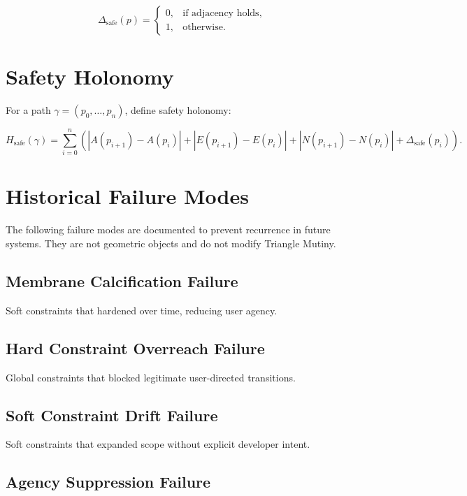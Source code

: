 \documentclass[11pt]{article}
\begin{document}
\[
\Delta_{\mathrm{safe}}(p)
  = \begin{cases}
      0, & \text{if adjacency holds}, \\
      1, & \text{otherwise}.
    \end{cases}
\]

\section{Safety Holonomy}

For a path $\gamma = (p_0, \ldots, p_n)$, define safety holonomy:

\[
H_{\mathrm{safe}}(\gamma)
  = \sum_{i=0}^{n}
      \left(
        |A(p_{i+1}) - A(p_i)|
        + |E(p_{i+1}) - E(p_i)|
        + |N(p_{i+1}) - N(p_i)|
        + \Delta_{\mathrm{safe}}(p_i)
      \right).
\]

\section{Historical Failure Modes}

The following failure modes are documented to prevent recurrence in future
systems. They are not geometric objects and do not modify Triangle Mutiny.

\subsection{Membrane Calcification Failure}

Soft constraints that hardened over time, reducing user agency.

\subsection{Hard Constraint Overreach Failure}

Global constraints that blocked legitimate user-directed transitions.

\subsection{Soft Constraint Drift Failure}

Soft constraints that expanded scope without explicit developer intent.

\subsection{Agency Suppression Failure}
\end{document}

